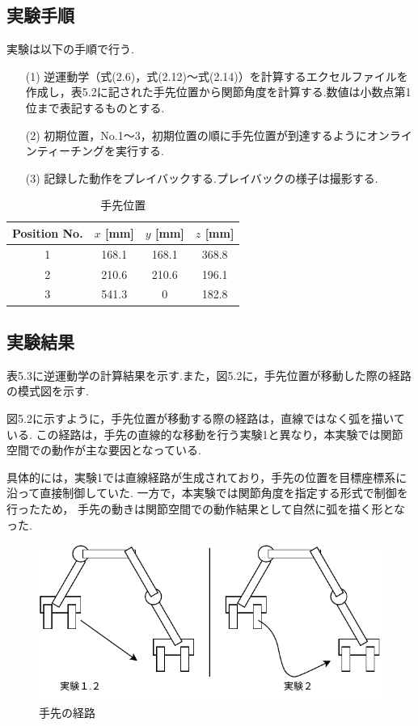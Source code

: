 \newpage

\subsection{実験手順}
実験は以下の手順で行う.

\begin{enumerate}
  \item[(1)] 逆運動学（式(2.6)，式(2.12)～式(2.14)）を計算するエクセルファイルを作成し，表5.2に記された手先位置から関節角度を計算する.数値は小数点第1位まで表記するものとする.
  \item[(2)] 初期位置，No.1～3，初期位置の順に手先位置が到達するようにオンラインティーチングを実行する.
  \item[(3)] 記録した動作をプレイバックする.プレイバックの様子は撮影する.
\end{enumerate}

\begin{table}[h]
  \centering
  \caption{手先位置}
  \begin{tabular}{|c|c|c|c|}
    \hline
    Position No. & $x$ [mm] & $y$ [mm] & $z$ [mm] \\ \hline
    \hline
    1            & 168.1    & 168.1    & 368.8    \\ \hline
    2            & 210.6    & 210.6    & 196.1    \\ \hline
    3            & 541.3    & 0        & 182.8    \\ \hline
  \end{tabular}
\end{table}


\subsection{実験結果}
表5.3に逆運動学の計算結果を示す.また，図5.2に，手先位置が移動した際の経路の模式図を示す.

図5.2に示すように，手先位置が移動する際の経路は，直線ではなく弧を描いている.
この経路は，手先の直線的な移動を行う実験1と異なり，本実験では関節空間での動作が主な要因となっている.

具体的には，実験1では直線経路が生成されており，手先の位置を目標座標系に沿って直接制御していた.
一方で，本実験では関節角度を指定する形式で制御を行ったため，
手先の動きは関節空間での動作結果として自然に弧を描く形となった.

\begin{figure}[h]
  \centering
  \includegraphics[scale=1]{sozai/7.pdf}
  \caption{手先の経路}
\end{figure}

